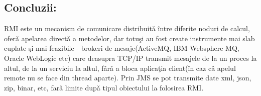 \subsection{Concluzii:}
RMI este un mecanism de comunicare distribuit\v{a} \^{i}ntre diferite noduri de calcul, 
ofer\v{a} apelarea direct\v{a} a metodelor, dar totu\c{s}i au fost create instrumente
mai slab cuplate \c{s}i mai feazibile - brokeri de mesaje(ActiveMQ, IBM Websphere MQ, Oracle WebLogic etc) care deasupra TCP/IP transmit mesajele de la un proces la altul, de la un serviciu la altul, f\v{a}r\v{a} a bloca aplica\c{t}ia client(\^{i}n caz c\^{a} apelul remote nu se face
din thread aparte). Prin JMS se pot transmite date xml, json, zip, binar, etc, far\v{a} limite
dup\v{a} tipul obiectului la folosirea RMI.
